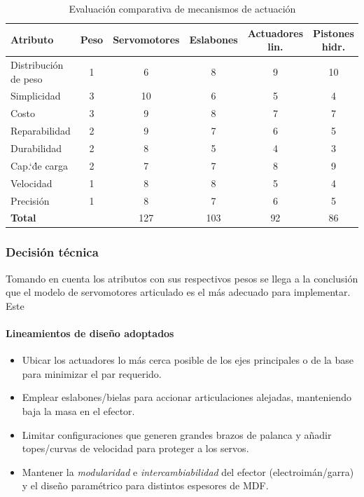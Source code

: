 \begin{table}[H]
\centering
\caption{Evaluación comparativa de mecanismos de actuación}
\begin{tabular}{lccccc}
\toprule
\textbf{Atributo} & \textbf{Peso} & \textbf{Servomotores} & \textbf{Eslabones} & \textbf{Actuadores lin.} & \textbf{Pistones hidr.} \\
\midrule
Distribución de peso & 1 & 6  & 8  & 9 & 10 \\
Simplicidad          & 3 & 10 & 6  & 5 & 4  \\
Costo                & 3 & 9  & 8  & 7 & 7  \\
Reparabilidad        & 2 & 9  & 7  & 6 & 5  \\
Durabilidad          & 2 & 8  & 5  & 4 & 3  \\
Cap.`\'de carga      & 2 & 7  & 7  & 8 & 9  \\
Velocidad            & 1 & 8  & 8  & 5 & 4  \\
Precisión            & 1 & 8  & 7  & 6 & 5  \\
\midrule
\textbf{Total}       &    & 127 & 103 & 92 & 86 \\
\bottomrule
\end{tabular}
\end{table}


\subsubsection*{Decisión técnica}
Tomando en cuenta los atributos con sus respectivos pesos se llega a la conclusión que el modelo de servomotores articulado es el más adecuado para implementar. Este 
\paragraph{Lineamientos de diseño adoptados}
\begin{itemize}
  \item Ubicar los actuadores lo más cerca posible de los ejes principales o de la base para minimizar el par requerido.
  \item Emplear eslabones/bielas para accionar articulaciones alejadas, manteniendo baja la masa en el efector.
  \item Limitar configuraciones que generen grandes brazos de palanca y añadir topes/curvas de velocidad para proteger a los servos.
  \item Mantener la \emph{modularidad} e \emph{intercambiabilidad} del efector (electroimán/garra) y el diseño paramétrico para distintos espesores de MDF.\@
\end{itemize}

